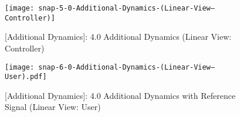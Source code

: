 \documentclass[crop=false,float=true,class=scrreprt]{standalone}
\begin{document}
\clearpage




\begin{landscape}
\begin{figure}[H]%
\centering%
\begin{minipage}[c][0.995\textheight][c]{0.995\linewidth}%
\centering%
\texttt{[image: snap-5-0-Additional-Dynamics-(Linear-View---Controller)]}%
\caption[{[Additional Dynamics]: 4.0 Additional Dynamics (Linear View: Controller)}]%
        {{[Additional Dynamics]: 4.0 Additional Dynamics (Linear View: Controller)%
          \label{FIG:controllerDesign:additionalDynamics:background:5p0:additionalDynamics:linearView:controller}%
        }}%
\end{minipage}%
\end{figure}
\end{landscape}




\clearpage




\begin{landscape}
\begin{figure}[H]%
\centering%
\begin{minipage}[c][0.995\textheight][c]{0.995\linewidth}%
\centering%
\texttt{[image: snap-6-0-Additional-Dynamics-(Linear-View---User).pdf]}%
\caption[{[Additional Dynamics]: 4.0 Additional Dynamics with Reference Signal (Linear View: User)}]%
        {{[Additional Dynamics]: 4.0 Additional Dynamics with Reference Signal (Linear View: User)%
          \label{FIG:controllerDesign:additionalDynamics:background:6p0:additionalDynamics:linearView:user}%
        }}%
\end{minipage}%
\end{figure}
\end{landscape}




\clearpage
\end{document}
